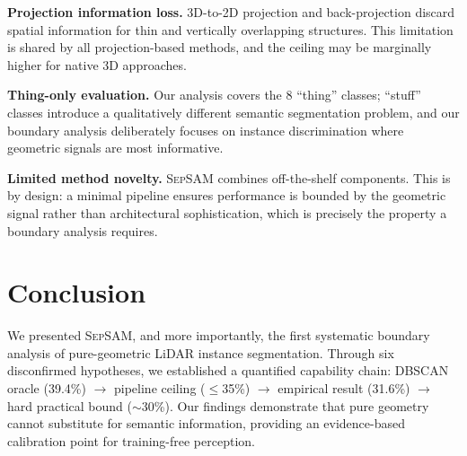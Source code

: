 \documentclass{article}
\begin{document}
\textbf{Projection information loss.} 3D-to-2D projection and back-projection
discard spatial information for thin and vertically overlapping structures. This
limitation is shared by all projection-based methods, and the ceiling may be
marginally higher for native 3D approaches.

\textbf{Thing-only evaluation.} Our analysis covers the 8 ``thing'' classes;
``stuff'' classes introduce a qualitatively different semantic segmentation
problem, and our boundary analysis deliberately focuses on instance discrimination
where geometric signals are most informative.

\textbf{Limited method novelty.} \textsc{SepSAM} combines off-the-shelf components.
This is by design: a minimal pipeline ensures performance is bounded by the
geometric signal rather than architectural sophistication, which is precisely the
property a boundary analysis requires.

\section{Conclusion}

We presented \textsc{SepSAM}, and more importantly, the first systematic boundary
analysis of pure-geometric LiDAR instance segmentation. Through six disconfirmed
hypotheses, we established a quantified capability chain: DBSCAN oracle
(39.4\%) $\rightarrow$ pipeline ceiling ($\leq$35\%) $\rightarrow$ empirical
result (31.6\%) $\rightarrow$ hard practical bound ($\sim$30\%). Our findings
demonstrate that pure geometry cannot substitute for semantic information,
providing an evidence-based calibration point for training-free perception.



\end{document}
